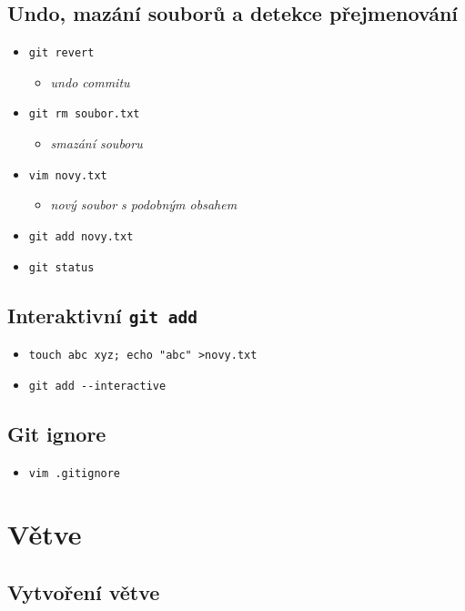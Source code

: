 \documentclass[10pt,twocolumn]{article}
\begin{document}
\subsection{Undo, mazání souborů a detekce přejmenování}

\begin{itemize}
  \item \texttt{git revert}
  \begin{itemize} \item \textit{undo commitu} \end{itemize}
  \item \texttt{git rm soubor.txt}
  \begin{itemize} \item \textit{smazání souboru} \end{itemize}
  \item \texttt{vim novy.txt}
  \begin{itemize} \item \textit{nový soubor s podobným obsahem} \end{itemize}
  \item \texttt{git add novy.txt}
  \item \texttt{git status}
\end{itemize}

\subsection{Interaktivní \texttt{git add}}

\begin{itemize}
  \item \texttt{touch abc xyz; echo "abc" >novy.txt}
  \item \texttt{git add {-}{-}interactive}
\end{itemize}

\subsection{Git ignore}

\begin{itemize}
  \item \texttt{vim .gitignore}
\end{itemize}

\section{Větve}
\subsection{Vytvoření větve}
\end{document}
